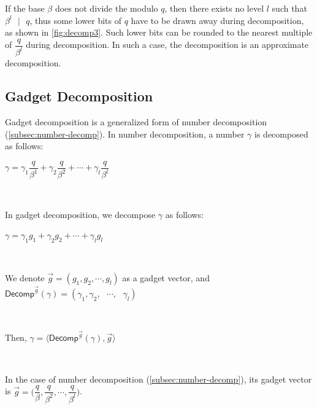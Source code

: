 If the base $\beta$ does not divide the modulo $q$, then there exists no level $l$ such that $\beta^l \text{ } | \text{ } q$, thus some lower bits of $q$ have to be drawn away during decomposition, as shown in \autoref{fig:decomp3}. Such lower bits can be rounded to the nearest multiple of $\dfrac{q}{\beta^l}$ during decomposition. In such a case, the decomposition is an approximate decomposition. 




\subsection{Gadget Decomposition}
\label{subsec:gadget-decomposition}

Gadget decomposition is a generalized form of number decomposition (\autoref{subsec:number-decomp}). In number decomposition, a number $\gamma$ is decomposed as follows: 

$\gamma = \gamma_1 \dfrac{q}{\beta^1} + \gamma_2 \dfrac{q}{\beta^2} + \cdots + \gamma_l \dfrac{q}{\beta^l} $

$ $

In gadget decomposition, we decompose $\gamma$ as follows: 

$\gamma = \gamma_1 g_1 + \gamma_2 g_2 + \cdots + \gamma_l g_l $

$ $

We denote $\vec{g} = (g_1, g_2, \cdots, g_l)$ as a gadget vector, and $\textsf{Decomp}^{\vec{g}}(\gamma) = (\gamma_1, \gamma_2, \text{ } \cdots , \text{ } \gamma_l) $

$ $

Then, $\gamma = \langle \textsf{Decomp}^{\vec{g}}(\gamma), \vec{g} \rangle $

$ $

In the case of number decomposition (\autoref{subsec:number-decomp}), its gadget vector is $\vec{g} = \Bigg(\dfrac{q}{\beta}, \dfrac{q}{\beta^2}, \cdots, \dfrac{q}{\beta^l}\Bigg)$.



